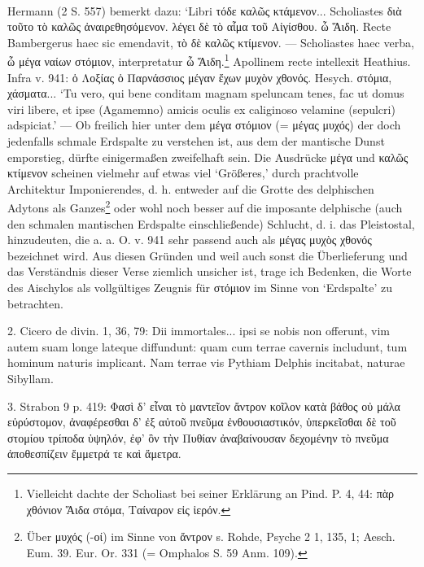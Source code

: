 \documentclass[a4paper, 11pt, oneside]{article}
\begin{document}
\paragraph{}
Hermann (2 S. 557) bemerkt dazu: `Libri τόδε καλῶς κτάμενον... Scholiastes διὰ τοῦτο τὸ καλῶς ἀναιρεθησόμενον. λέγει δὲ τὸ αἷμα τοῦ Αἰγίσθου. ὦ Ἅιδη. Recte Bambergerus haec sic emendavit, τὸ δὲ καλῶς κτίμενον. --- Scholiastes haec verba, ὦ μέγα ναίων στόμιον, interpretatur ὦ Ἅιδη.\footnote{Vielleicht dachte der Scholiast bei seiner Erklärung an Pind. P. 4, 44: πὰρ χθόνιον Ἅιδα στόμα, Ταίναρον εἰς ἱερόν.} Apollinem recte intellexit Heathius. Infra v. 941: ὁ Λοξίας ὁ Παρνάσσιος μέγαν ἔχων μυχὸν χθονός. Hesych. στόμια, χάσματα... `Tu vero, qui bene conditam magnam speluncam tenes, fac ut domus viri libere, et ipse (Agamemno) amicis oculis ex caliginoso velamine (sepulcri) adspiciat.' --- Ob freilich hier unter dem μέγα στόμιον (= μέγας μυχός) der doch jedenfalls schmale Erdspalte zu verstehen ist, aus dem der mantische Dunst emporstieg, dürfte einigermaßen zweifelhaft sein. Die Ausdrücke μέγα und καλῶς κτίμενον scheinen vielmehr auf etwas viel `Größeres,' durch prachtvolle Architektur Imponierendes, d. h. entweder auf die Grotte des delphischen Adytons als Ganzes\footnote{Über μυχός (-οί) im Sinne von ἄντρον s. Rohde, Psyche 2 1, 135, 1; Aesch. Eum. 39. Eur. Or. 331 (= Omphalos S. 59 Anm. 109).} oder wohl noch besser auf die imposante delphische (auch den schmalen mantischen Erdspalte einschließende) Schlucht, d. i. das Pleistostal, hinzudeuten, die a. a. O. v. 941 sehr passend auch als μέγας μυχὸς χθονός bezeichnet wird. Aus diesen Gründen und weil auch sonst die Überlieferung und das Verständnis dieser Verse ziemlich unsicher ist, trage ich Bedenken, die Worte des Aischylos als vollgültiges Zeugnis für στόμιον im Sinne von `Erdspalte' zu betrachten.

2. Cicero de divin. 1, 36, 79: Dii immortales... ipsi se nobis non offerunt, vim autem suam longe lateque diffundunt: quam cum terrae cavernis includunt, tum hominum naturis implicant. Nam terrae vis Pythiam Delphis incitabat, naturae Sibyllam.

3. Strabon 9 p. 419: Φασὶ δ' εἶναι τὸ μαντεῖον ἄντρον κοῖλον κατὰ βάθος οὐ μάλα εὐρύστομον, ἀναφέρεσθαι δ' ἐξ αὐτοῦ πνεῦμα ἐνθουσιαστικόν, ὑπερκεῖσθαι δὲ τοῦ στομίου τρίποδα ὑψηλόν, ἐφ' ὃν τὴν Πυθίαν ἀναβαίνουσαν δεχομένην τὸ πνεῦμα ἀποθεσπίζειν ἔμμετρά τε καὶ ἄμετρα.
\end{document}
